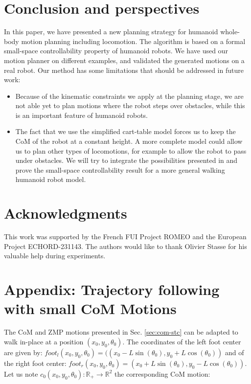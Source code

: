 \documentclass{article}
\begin{document}
\section{Conclusion and perspectives}

In this paper, we have presented a new planning strategy for humanoid whole-body
motion planning including locomotion. The algorithm is based on a formal
small-space controllability property of humanoid robots. 
We have used our motion planner on different examples, and validated the
generated motions on a real robot.
Our method has some limitations that should be addressed in future work:
\begin{itemize}
\item Because of the kinematic constraints we apply at the planning stage, we are not
	able yet to plan motions where the robot steps over obstacles, while this is an 
	important feature of humanoid robots.
\item The fact that we use the simplified cart-table model forces us to keep the CoM
	of the robot at a constant height. A more complete model could allow us to plan
	other types of locomotions, for example to allow the robot to pass under 
	obstacles. We will try to integrate the possibilities 
        presented in \cite{kanehiro2004locomotion} and prove the small-space controllability
        result for a more general walking humanoid robot model.
\end{itemize}

\section{Acknowledgments}

This work was supported by the French FUI Project ROMEO and the European Project ECHORD-231143. 
The authors would like to thank Olivier Stasse for his valuable help during experiments.

\section*{Appendix: Trajectory following with small CoM Motions}


The  CoM  and ZMP  motions  presented in Sec. \ref{sec:com-stc} 
 can  be  adapted to  walk
in-place  at  a position  $(x_0,y_0,\theta_0)$. The coordinates  of the
left foot center are given by: 
$foot_l(x_0,y_0,\theta_0) = (\left( x_0 - L  \sin (\theta_0), y_0 + L \cos
(\theta_0)\right)$
and of the right foot center: 
$foot_r(x_0,y_0,\theta_0) = \left( x_0 + L  \sin (\theta_0), y_0 - L \cos
(\theta_0)\right)$. Let us  note $c_0(x_0,y_0,\theta_0) : \mathbb{R}_+
\rightarrow \mathbb{R}^2$ the corresponding CoM motion:
\end{document}
